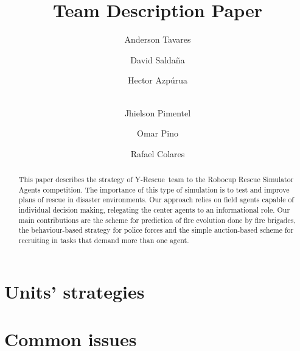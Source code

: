 \documentclass[runningheads,a4paper]{llncs}
\title{\teamname Team Description Paper}
\author{Anderson Tavares \and David Saldaña \and Hector Azpúrua \and\\ Jhielson Pimentel \and Omar Pino \and Rafael Colares}%
\newcommand{\teamname}{Y-Rescue~}
\begin{document}
\titlerunning{\teamname TDP}



\maketitle

\begin{abstract}
This paper describes the strategy of \teamname team to the Robocup Rescue Simulator Agents competition. The importance of this type of simulation is to test and improve plans of rescue in disaster environments. Our approach relies on field agents capable of individual decision making, relegating the center agents to an informational role. Our main contributions are the scheme for prediction of fire evolution done by fire brigades, the behaviour-based strategy for police forces and the simple auction-based scheme for recruiting in tasks that demand more than one agent.
\end{abstract}



\section{Units' strategies}
\label{sec:strategies}









\section{Common issues}
\label{sec:common}









\end{document}
